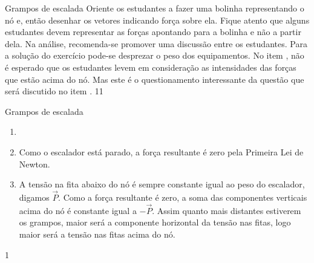 \begin{sugestions}{Grampos de escalada}
{
Oriente os estudantes a fazer uma bolinha representando o nó e, então desenhar os vetores indicando força sobre ela. Fique atento que alguns estudantes devem representar as forças apontando para a bolinha e não a partir dela. Na análise, recomenda-se promover uma discussão entre os estudantes. Para a solução do exercício pode-se desprezar o peso dos equipamentos. No item , não é esperado que os estudantes levem em consideração as intensidades das forças que estão acima do nó. Mas este é o questionamento interessante da questão que será discutido no item .
}{1}{1}
\end{sugestions}
\begin{answer}{Grampos de escalada}
{
\begin{enumerate}
\item {} 

{
}

\item {} 
Como o escalador está parado, a força resultante é zero pela Primeira Lei de Newton.

\item {} 
A tensão na fita abaixo do nó é sempre constante igual ao peso do escalador, digamos \(\vec{P}\). Como a força resultante é zero, a soma das componentes verticais acima do nó é constante igual a \(-\vec{P}\). Assim quanto mais distantes estiverem os grampos, maior será a componente horizontal da tensão nas fitas, logo maior será a tensão nas fitas acima do nó.

\end{enumerate}
}{1}
\end{answer}
